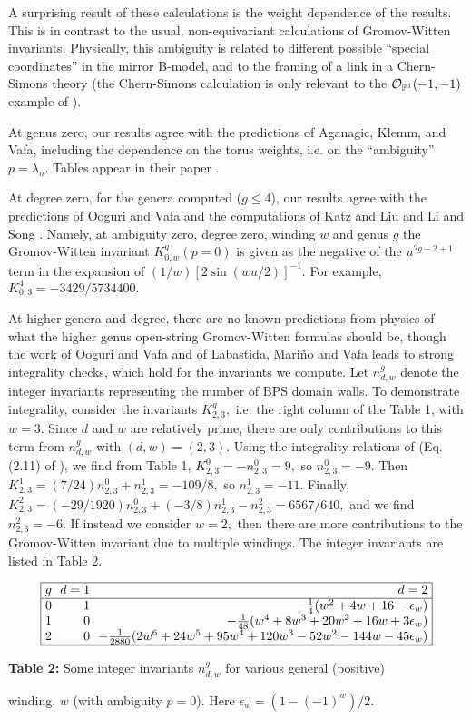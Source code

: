 \documentclass[a4paper,11pt]{article}
\newcommand{\PP}{{\mathbb{P}}}
\begin{document}
A surprising result of these calculations
is the weight dependence of the results.  This is in
contrast to the usual, non-equivariant
calculations of Gromov-Witten
invariants.
Physically, this ambiguity is related to different possible
``special coordinates'' in the mirror B-model, and to
the framing of a link in a Chern-Simons theory 
\cite{AKV}
(the Chern-Simons calculation
is only relevant to the ${\cal O}_{\PP^1}(-1,-1)$ example
of \cite{KL} \cite{LS}).

At genus zero, our results agree with the predictions
of Aganagic, Klemm, and Vafa, including
the dependence on the torus weights,
i.e. on the ``ambiguity'' $p = \lambda_n.$
Tables appear in their paper \cite{AKV}.

At degree zero, for the genera computed ($g\leq 4$),
our results
agree with the predictions of Ooguri and Vafa \cite{OV}
and the computations of Katz and Liu \cite{KL}
and Li and Song \cite{LS}.
Namely, at ambiguity zero, degree zero,
winding $w$ and genus $g$ the Gromov-Witten
invariant $K^{g}_{0,w}(p=0)$
is given as the negative
of the $u^{2g-2+1}$ term in the expansion
of $(1/w)[2\sin (wu/2)]^{-1}.$
For example, $K^4_{0,3} = -3429/5734400.$

At higher genera and degree, there are no known predictions from
physics of what the higher genus
open-string Gromov-Witten
formulas should be, though the work of Ooguri and
Vafa \cite{OV}
and of Labastida, Mari\~no and Vafa \cite{LMV}
leads to strong integrality checks, which hold
for the invariants we compute.
Let $n^{g}_{d,w}$ denote the integer invariants
representing the number of BPS domain walls.
To demonstrate integrality,
consider the invariants $K^g_{2,3},$
i.e. the right column of the Table 1, with $w=3.$
Since $d$ and $w$
are relatively prime, there are only contributions
to this term from $n^{g}_{d,w}$ with
$(d,w) = (2,3).$  Using the integrality relations
of \cite{LMV} (Eq. (2.11) of \cite{MV}),
we find from Table 1,
$K^0_{2,3} = - n^0_{2,3} = 9,$ so $n^0_{2,3} = -9.$
Then
$K^1_{2,3} = (7/24) n^{0}_{2,3} + n^1_{2,3} = -109/8,$
so $n^1_{2,3} = -11.$  Finally,
$K^2_{2,3} = (-29/1920)n^0_{2,3} + (-3/8)n^{1}_{2,3}
- n^2_{2,3} = 6567/640,$ and we find
$n^2_{2,3} = -6.$  If instead we consider $w=2,$ then
there are more contributions to the Gromov-Witten
invariant due to multiple windings.
The integer invariants are listed in Table 2.


\vskip 0.2in


{\vbox{
$$
\vbox{\offinterlineskip\tabskip=0pt
\halign{\strut
\vrule#&
&\hfil ~$#$
&\hfil ~$#$
&\hfil ~$#$
&\vrule#\cr
\noalign{\hrule}
&g
&d=1
&d=2
&
\cr
\noalign{\hrule}
&0
&1
&-\frac{1}{4}(w^2 + 4w + 16 - \epsilon_{w})
&\cr
&1
&0
&-\frac{1}{48}(w^4 + 8w^3 + 20w^2 + 16w + 3 \epsilon_{w})
&\cr
&2
&0
&-\frac{1}{2880}(2w^6+24w^5+95w^4+120w^3-52w^2-144w -
45 \epsilon_{w})
&\cr
\noalign{\hrule}}\hrule}$$}
\centerline{{\bf Table 2:} Some
integer invariants $n^g_{d,w}$ for various general (positive)} 
\centerline{winding, $w$
(with ambiguity $p=0$). Here $\epsilon_{w}=
(1-(-1)^{w})/2.$}
\vskip7pt}
\end{document}

